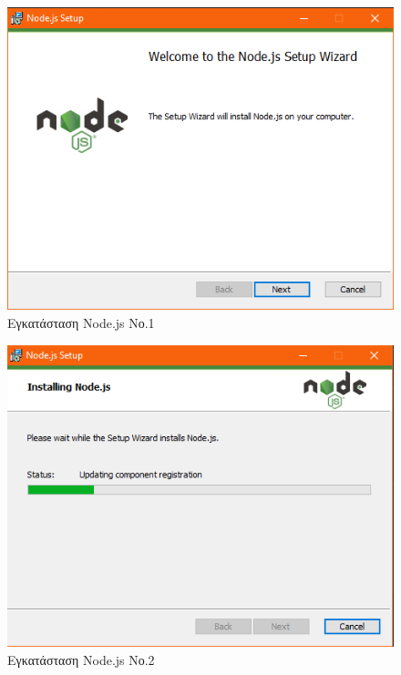 \documentclass[a4paper,12pt]{article}
\begin{document}
				\begin{figure}[!htb]
					\begin{center}
						\caption{Εγκατάσταση Node.js Νο.1}
						\vspace*{0.5cm}
						\includegraphics[width=0.9\linewidth]{nod0} 
					\end{center}
				\end{figure}

				\begin{figure}[!htb]
					\begin{center}
						\caption{Εγκατάσταση Node.js Νο.2}
						\vspace*{0.5cm}
						\includegraphics[width=0.9\linewidth]{nod} 
					\end{center}
				\end{figure}
\end{document}
